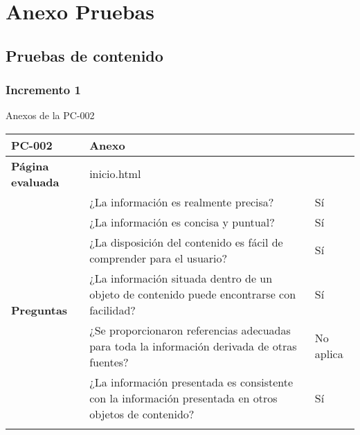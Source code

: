 \chapter{Anexo Pruebas}

\section{Pruebas de contenido}

\subsection{Incremento 1}

Anexos de la PC-002

\begin{table}[htpb]
\centering
\begin{tabularx}{\textwidth}{|l|X|l|}
\hline
\textbf{PC-002}                       & \multicolumn{2}{l|}{Anexo}                                                                                                \\ \hline
\textbf{Página evaluada}             & \multicolumn{2}{l|}{inicio.html}                                                                                          \\ \hline
\multirow{10}{*}{\textbf{Preguntas}} & ¿La información es realmente precisa?                                                                         & Sí        \\ \cline{2-3} 
                                     & ¿La información es concisa y puntual?                                                                         & Sí        \\ \cline{2-3} 
                                     & ¿La disposición del contenido es fácil de comprender para el usuario?                                         & Sí        \\ \cline{2-3} 
                                     & ¿La información situada dentro de un objeto de contenido puede encontrarse con facilidad?                     & Sí        \\ \cline{2-3} 
                                     & ¿Se proporcionaron referencias adecuadas para toda la información derivada de otras fuentes?                  & No aplica \\ \cline{2-3} 
                                     & ¿La información presentada es consistente con la información presentada en otros objetos de contenido?        & Sí        \\ \cline{2-3} 

\end{tabularx}
\end{table}
